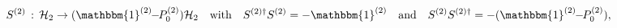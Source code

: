 \begin{equation}
 S^{(2)}\,:\,\mathcal{H}_2\rightarrow 
 (\mathbbm{1}^{(2)}\!\!-\!\!P_0^{(2)}) 
 \mathcal{H}_2\quad\text{with}\quad
 S^{(2)\dagger}S^{(2)}=-\mathbbm{1}^{(2)}\quad\text{and}\quad
 S^{(2)}S^{(2)\dagger} = -(\mathbbm{1}^{(2)}\!\!-\!\!P_0^{(2)}),
\end{equation}

